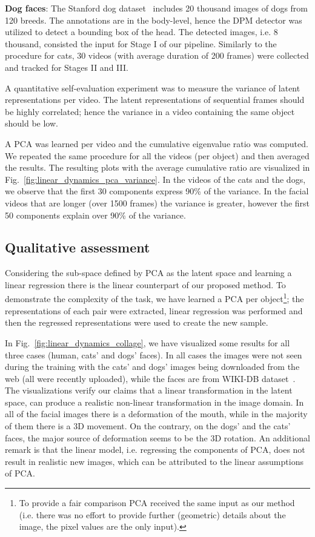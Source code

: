 \documentclass[10pt,twocolumn,letterpaper]{article}
\begin{document}
\textbf{Dog faces}: The Stanford dog dataset~\cite{khosla2011novel} includes 20 thousand images of dogs from 120 breeds. The annotations are in the body-level, hence the DPM detector was utilized to detect a bounding box of the head. The detected images, i.e. 8 thousand, consisted the input for Stage I of our pipeline. Similarly to the procedure for cats, 30 videos (with average duration of 200 frames) were collected and tracked for Stages II and III. 

A quantitative self-evaluation experiment was to measure the variance of latent representations per video. The latent representations of sequential frames should be highly correlated; hence the variance in a video containing the same object should be low. 

A PCA was learned per video and the cumulative eigenvalue ratio was computed. We repeated the same procedure for all the videos (per object) and then averaged the results. The resulting plots with the average cumulative ratio are visualized in Fig.~\ref{fig:linear_dynamics_pca_variance}. In the videos of the cats and the dogs, we observe that the first 30 components express 90\% of the variance. In the facial videos that are longer (over 1500 frames) the variance is greater, however the first 50 components explain over 90\% of the variance. 

\subsection{Qualitative assessment}
Considering the sub-space defined by PCA as the latent space and learning a linear regression there is the linear counterpart of our proposed method. To demonstrate the complexity of the task, we have learned a PCA per object\footnote{To provide a fair comparison PCA received the same input as our method (i.e. there was no effort to provide further (geometric) details about the image, the pixel values are the only input).}; the representations of each pair were extracted, linear regression was performed and then the regressed representations were used to create the new sample. 

In Fig.~\ref{fig:linear_dynamics_collage}, we have visualized some results for all three cases (human, cats' and dogs' faces). In all cases the images were not seen during the training with the cats' and dogs' images being downloaded from the web (all were recently uploaded), while the faces are from WIKI-DB dataset~\cite{rothe2016deep}. The visualizations verify our claims that a linear transformation in the latent space, can produce a realistic non-linear transformation in the image domain. In all of the facial images there is a deformation of the mouth, while in the majority of them there is a 3D movement. On the contrary, on the dogs' and the cats' faces, the major source of deformation seems to be the 3D rotation. An additional remark is that the linear model, i.e. regressing the components of PCA, does not result in realistic new images, which can be attributed to the linear assumptions of PCA. 
\end{document}
